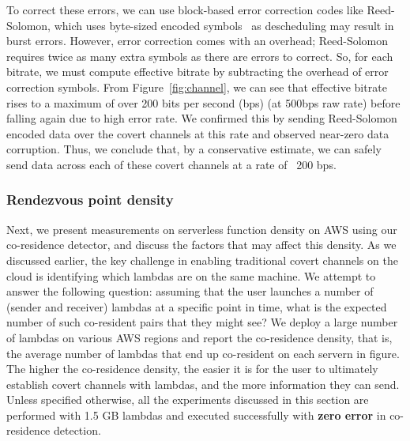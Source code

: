 To correct these errors, we can use block-based error correction codes like
Reed-Solomon, which uses byte-sized encoded symbols~\cite{wuusenix2012} as
descheduling may result in burst errors.
However, error correction comes with an overhead; Reed-Solomon requires twice as
many extra symbols as there are errors to correct. So, for each bitrate, we must compute
effective bitrate by subtracting the overhead of error correction symbols.
From Figure~\ref{fig:channel}, we can see that effective bitrate rises to a
maximum of over 200 bits per second (bps) (at 500bps raw rate) before falling
again due to high error rate. We confirmed this by sending Reed-Solomon encoded
data over the covert channels at this rate and observed near-zero data
corruption. Thus, we conclude that, by a conservative estimate, we can safely
send data across each of these covert channels at a rate of ~200 bps.

\subsubsection{Rendezvous point density}
Next, we present measurements on serverless function density on AWS using our
co-residence detector, and discuss the factors that may affect this density.  As
we discussed earlier, the key challenge in enabling traditional covert channels
on the cloud is identifying which lambdas are on the same machine. We attempt to
answer the following question: assuming that the user launches a number of
(sender and receiver) lambdas at a specific point in time, what is the expected
number of such co-resident pairs that they might see? We deploy a large number
of lambdas on various AWS regions and report the co-residence density, that is,
the average number of lambdas that end up co-resident on each servern in
figure\todo. The higher the co-residence density, the easier it is for the user
to ultimately establish covert channels with lambdas, and the more information
they can send. Unless specified otherwise, all the experiments discussed in this
section are performed with 1.5 GB lambdas and executed successfully with
\textbf{zero error} in co-residence detection.


